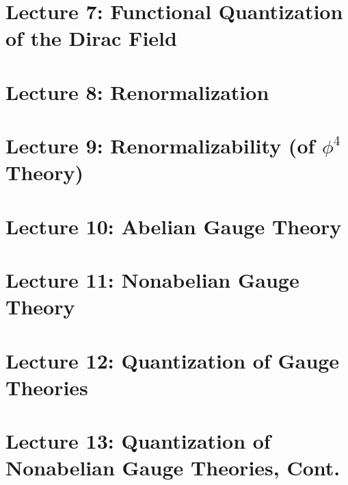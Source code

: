 \documentclass[10pt]{article}
\begin{document}
\section*{Lecture 7: Functional Quantization of the Dirac Field}
\label{sec: lec7}



\clearpage

\section*{Lecture 8: Renormalization}
\label{sec: lec8}



\clearpage

\section*{Lecture 9: Renormalizability (of $\phi^4$ Theory)}
\label{sec: lec9}



\clearpage

\section*{Lecture 10: Abelian Gauge Theory}
\label{sec: lec10}



\clearpage

\section*{Lecture 11: Nonabelian Gauge Theory}
\label{sec: lec11}



\clearpage

\section*{Lecture 12: Quantization of Gauge Theories}
\label{sec: lec12}



\clearpage

\section*{Lecture 13: Quantization of Nonabelian Gauge Theories, Cont.}
\label{sec: lec13}

%

\end{document}

